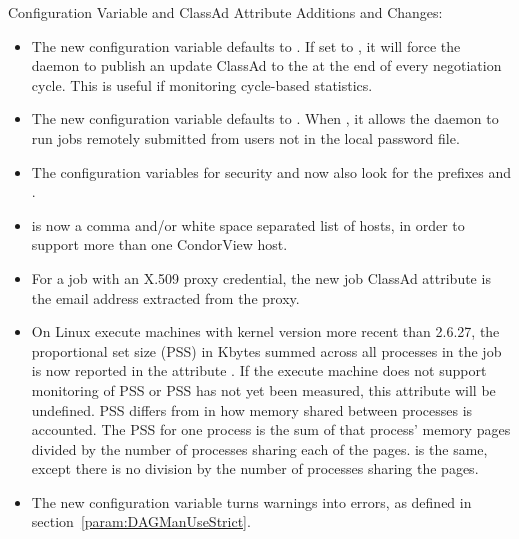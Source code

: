\noindent Configuration Variable and ClassAd Attribute Additions and Changes:

\begin{itemize}

\item The new configuration variable 
defaults to .
If set to , it will force the  daemon
to publish an update ClassAd to the  at the end of 
every negotiation cycle. 
This is useful if monitoring cycle-based statistics.

\item The new configuration variable 
defaults to .
When , it allows the  daemon to run jobs remotely 
submitted from users not in the local password file.

\item The configuration variables for security 
 and 
now also look for the prefixes  and .
 
\item {} is now a comma and/or white space separated
list of hosts, in order to support more than one CondorView host.

\item For a job with an X.509 proxy credential, the new job ClassAd
attribute  is the email address extracted
from the proxy.

\item On Linux execute machines with kernel version more recent than 2.6.27,
the proportional set size (PSS) in Kbytes summed across all
processes in the job is now reported in the attribute
.  If the execute machine does not
support monitoring of PSS or PSS has not yet been measured, this
attribute will be undefined.  PSS differs from  in
how memory shared between processes is accounted.  The PSS for one
process is the sum of that process' memory pages divided by the
number of processes sharing each of the pages.   is
the same, except there is no division by the number of processes
sharing the pages.

\item The new configuration variable  
turns warnings into errors, as defined in section~\ref{param:DAGManUseStrict}.


\end{itemize}
